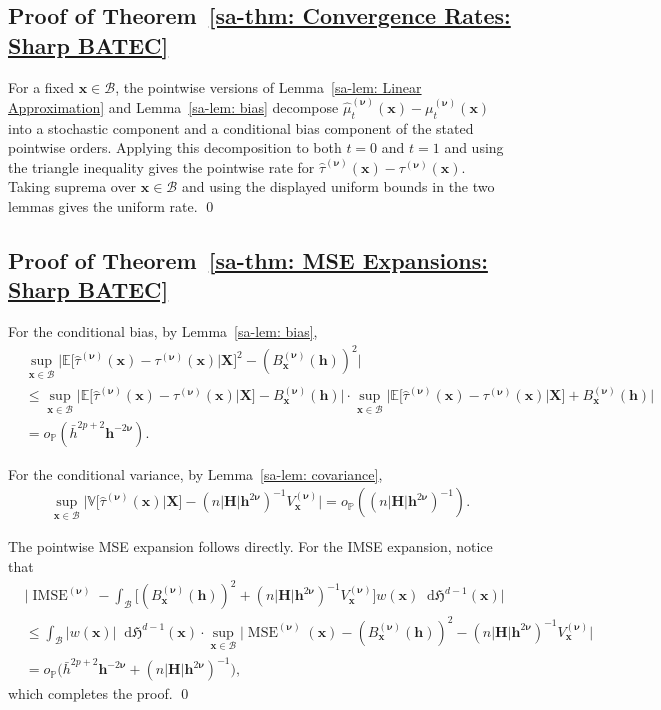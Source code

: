 \documentclass[10pt]{article}
\renewcommand{\P}{\mathbb{P}}
\newcommand{\E}{\mathbb{E}}
\newcommand{\Var}{\mathbb{V}}
\newcommand{\Haus}{\mathfrak{H}}
\newcommand{\dif}{\mathop{}\!\mathrm{d}}
\newcommand{\bh}{\mathbf{h}}
\newcommand{\bH}{\mathbf{H}}
\newcommand{\bx}{\mathbf{x}}
\newcommand{\bX}{\mathbf{X}}
\newcommand{\bnu}{\boldsymbol{\nu}}
\newcommand{\B}{\mathcal{B}}
\begin{document}
\subsection{Proof of Theorem~\ref{sa-thm: Convergence Rates: Sharp BATEC}}

For a fixed $\bx\in\B$, the pointwise versions of Lemma~\ref{sa-lem: Linear Approximation} and Lemma~\ref{sa-lem: bias} decompose
$\widehat{\mu}^{(\bnu)}_t(\bx)-\mu_t^{(\bnu)}(\bx)$ into a stochastic component and a conditional bias component of the stated pointwise orders. Applying this decomposition to both $t=0$ and $t=1$ and using the triangle inequality gives the pointwise rate for $\widehat{\tau}^{(\bnu)}(\bx)-\tau^{(\bnu)}(\bx)$. Taking suprema over $\bx\in\B$ and using the displayed uniform bounds in the two lemmas gives the uniform rate.
\qed

\subsection{Proof of Theorem~\ref{sa-thm: MSE Expansions: Sharp BATEC}}

For the conditional bias, by Lemma~\ref{sa-lem: bias},
\begin{align*}
    & \sup_{\bx \in \B} \big|\E \big[\widehat{\tau}^{(\bnu)}(\bx) - \tau^{(\bnu)}(\bx) \big| \bX \big]^2 - (B_{\bx}^{(\bnu)}(\bh))^2 \big| \\
    & \leq \sup_{\bx \in \B} \big|\E \big[\widehat{\tau}^{(\bnu)}(\bx) - \tau^{(\bnu)}(\bx) \big| \bX \big] - B_{\bx}^{(\bnu)}(\bh) \big| \cdot \sup_{\bx \in \B} \big|\E \big[\widehat{\tau}^{(\bnu)}(\bx) - \tau^{(\bnu)}(\bx) \big| \bX \big] + B_{\bx}^{(\bnu)}(\bh) \big| \\
    & = o_{\P}(\bar{h}^{2p+2}\bh^{-2\bnu}).
\end{align*}

For the conditional variance, by Lemma~\ref{sa-lem: covariance},
\begin{align*}
    \sup_{\bx \in \B} \big|\Var\big[\widehat{\tau}^{(\bnu)}(\bx) \big|\bX \big] -  (n|\bH|\bh^{2\bnu})^{-1} V_{\bx}^{(\bnu)} \big|
    = o_{\P}((n|\bH|\bh^{2\bnu})^{-1}).
\end{align*}

The pointwise MSE expansion follows directly. For the IMSE expansion, notice that
\begin{align*}
    & \Big|\operatorname{IMSE}^{(\bnu)} - \int_{\B} \big[(B_{\bx}^{(\bnu)}(\bh))^2 + (n|\bH|\bh^{2\bnu})^{-1} V_{\bx}^{(\bnu)}\big] w(\bx) \dif\Haus^{d-1}(\bx)\Big|\\
    & \leq \int_{\B} |w(\bx)| \dif\Haus^{d-1}(\bx) \cdot \sup_{\bx \in \B} \big|\operatorname{MSE}^{(\bnu)}(\bx) -  (B_{\bx}^{(\bnu)}(\bh))^2 - (n|\bH|\bh^{2\bnu})^{-1} V_{\bx}^{(\bnu)}\big|\\
    & = o_{\P} \big(\bar{h}^{2p+2}\bh^{-2\bnu} + (n|\bH|\bh^{2\bnu})^{-1} \big),
\end{align*}
which completes the proof.
\qed
\end{document}
